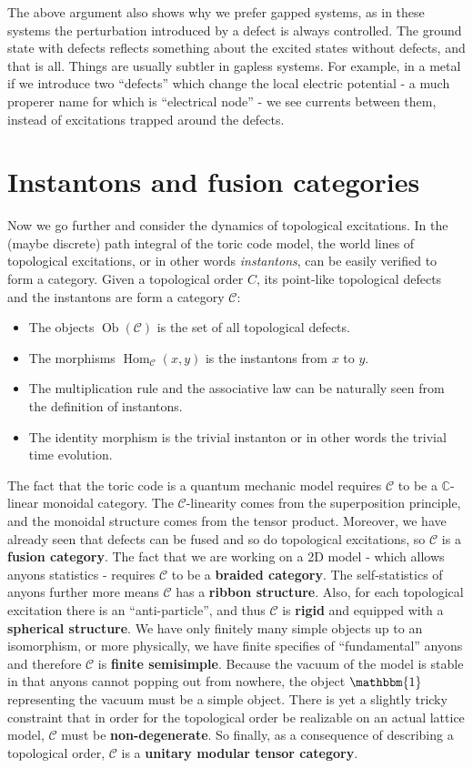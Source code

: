 \documentclass[hyperref, a4paper]{article}
\DeclareMathOperator{\object}{Ob}
\DeclareMathOperator{\morphism}{Hom}
\newcommand*{\concept}[1]{{\textbf{#1}}}
\begin{document}
The above argument also shows why we prefer gapped systems, as in these systems the perturbation introduced by a defect is always controlled.
The ground state with defects reflects something about the excited states without defects, and that is all.
Things are usually subtler in gapless systems.
For example, in a metal if we introduce two ``defects'' which change the local electric potential - a much properer name for which is ``electrical node'' - we see currents between them, instead of excitations trapped around the defects.

\section{Instantons and fusion categories}

Now we go further and consider the dynamics of topological excitations. 
In the (maybe discrete) path integral of the toric code model, the world lines of topological excitations, or in other words \emph{instantons}, can be easily verified to form a category.
Given a topological order $C$, its point-like topological defects and the instantons are form a category $\mathcal{C}$:
\begin{itemize}
    \item The objects $\object(\mathcal{C})$ is the set of all topological defects.
    \item The morphisms $\morphism_\mathcal{C}(x, y)$ is the instantons from $x$ to $y$.
    \item The multiplication rule and the associative law can be naturally seen from the definition of instantons.
    \item The identity morphism is the trivial instanton or in other words the trivial time evolution. 
\end{itemize}

The fact that the toric code is a quantum mechanic model requires $\mathcal{C}$ to be a $\mathbb{C}$-linear monoidal category.
The $\mathcal{C}$-linearity comes from the superposition principle, and the monoidal structure comes from the tensor product.
Moreover, we have already seen that defects can be fused and so do topological excitations, so $\mathcal{C}$ is a \concept{fusion category}.
The fact that we are working on a 2D model - which allows anyons statistics - requires $\mathcal{C}$ to be a \concept{braided category}.
The self-statistics of anyons further more means $\mathcal{C}$ has a \concept{ribbon structure}.
Also, for each topological excitation there is an ``anti-particle'', and thus $\mathcal{C}$ is \concept{rigid} and equipped with a \concept{spherical structure}.
We have only finitely many simple objects up to an isomorphism, or more physically, we have finite specifies of ``fundamental'' anyons and therefore $\mathcal{C}$ is \concept{finite semisimple}.
Because the vacuum of the model is stable in that anyons cannot popping out from nowhere, the object $\mathbbm{1}$ representing the vacuum must be a simple object.
There is yet a slightly tricky constraint that in order for the topological order be realizable on an actual lattice model, $\mathcal{C}$ must be \concept{non-degenerate}. %
So finally, as a consequence of describing a topological order, $\mathcal{C}$ is a \concept{unitary modular tensor category}.
\end{document}
